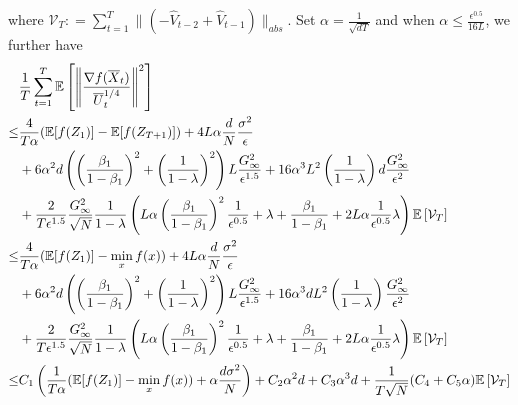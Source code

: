 \documentclass[11pt]{article}
\begin{document}
where $ \mathcal{V}_T : = \sum_{t=1}^{T}   \|    (- \hat V_{t-2} + \hat V_{t-1} ) \|_{abs}$.
Set $\alpha = \frac{1}{\sqrt{dT}}$ and when $\alpha  \leq \frac{\epsilon^{0.5}}{16L} $, we further have
\begin{align}\notag
& \frac{1}{T}\sum_{t=1}^T  \mathbb E \left [\left\|\frac{\nabla f( \overline X_{t})}{\overline U_{t}^{1/4}}\right\|^2  \right] \nonumber \\
\leq & \frac{4}{T\alpha} ( \mathbb E  [f( Z_{1})]  -  \mathbb E [f( Z_{T+1})]) +  {4L}\alpha  \frac{d}{N}
\frac{ \sigma^2 }{\epsilon}  \nonumber \\
&+  6\alpha^2 d \left(\left( \frac{\beta_1}{1-\beta_1}\right)^2 + \left (\frac{1}{1-\lambda} \right)^2 \right)L  \frac{G_{\infty}^2 }{\epsilon^{1.5}} +  {16}\alpha^3 L^2     \left( \frac{1}{1-\lambda}\right)d \frac{G_{\infty}^2}{\epsilon^2} \nonumber \\
& +   \frac{2}{T \epsilon^{1.5}}  \frac{G_{\infty}^2}{\sqrt{N}} \frac{1}{1-\lambda}  \left( L  \alpha \left ( \frac{\beta_1}{1-\beta_1} \right)^2     \frac{1}{{\epsilon^{0.5}}}  +   \lambda + \frac{\beta_1}{1-\beta_1} + 2L\alpha \frac{1}{\epsilon^{0.5}}\lambda   \right)   \mathbb E \left[ \mathcal{V}_T \right] \nonumber \\
\leq & \frac{4}{T\alpha} ( \mathbb E  [f( Z_{1})]  -  \min_x  f(x)) +  {4L}\alpha  \frac{d}{N}
\frac{ \sigma^2 }{\epsilon}  \nonumber \\
&+  6\alpha^2 d \left(\left( \frac{\beta_1}{1-\beta_1}\right)^2 + \left (\frac{1}{1-\lambda} \right)^2 \right)L  \frac{G_{\infty}^2 }{\epsilon^{1.5}} +  {16}\alpha^3d L^2     \left( \frac{1}{1-\lambda}\right) \frac{G_{\infty}^2}{\epsilon^2} \nonumber \\
& +   \frac{2}{T \epsilon^{1.5}}  \frac{G_{\infty}^2}{\sqrt{N}} \frac{1}{1-\lambda}  \left( L  \alpha \left ( \frac{\beta_1}{1-\beta_1} \right)^2     \frac{1}{{\epsilon^{0.5}}}  +   \lambda + \frac{\beta_1}{1-\beta_1} + 2L\alpha \frac{1}{\epsilon^{0.5}}\lambda   \right)   \mathbb E \left[ \mathcal{V}_T \right] \nonumber \\
\leq & C_1\left(\frac{1}{T\alpha} ( \mathbb E  [f( Z_{1})]  -  \min_x  f(x)) +  \alpha  \frac{d\sigma^2}{N}\right)
+  C_2 \alpha^2 d  +  C_3 \alpha^3d + \frac{1}{T\sqrt{N}} (C_4 +  C_5 \alpha) \mathbb E \left[ \mathcal{V}_T \right]   \nonumber \\

\end{align}
\end{document}
